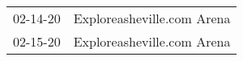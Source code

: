 \begin{supertabular}{p{0.07\textwidth}p{0.23\textwidth}}
 02-14-20 &  Exploreasheville.com Arena \\
 02-15-20 &  Exploreasheville.com Arena \\
\end{supertabular}
